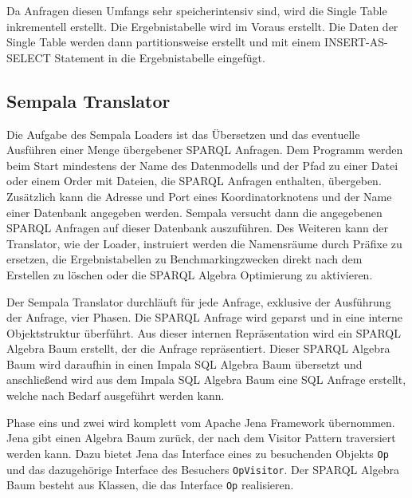 \documentclass[
  a4paper,
  12pt,
  oneside,
  parskip=half,
  headsepline,
]{scrartcl}
\begin{document}
Da Anfragen diesen Umfangs sehr speicherintensiv sind, wird die Single Table
inkrementell erstellt. Die Ergebnistabelle wird im Voraus erstellt. Die Daten der
Single Table werden dann partitionsweise erstellt und mit einem INSERT-AS-SELECT
Statement in die Ergebnistabelle eingefügt.

\subsection{Sempala Translator}
\label{sec:translator}


Die Aufgabe des Sempala Loaders ist das Übersetzen und das eventuelle Ausführen
einer Menge übergebener SPARQL Anfragen. Dem Programm werden beim Start
mindestens der Name des Datenmodells und der Pfad zu einer Datei oder einem
Order mit Dateien, die SPARQL Anfragen enthalten, übergeben. Zusätzlich kann die
Adresse und Port eines Koordinatorknotens und der Name einer Datenbank angegeben
werden. Sempala versucht dann die angegebenen SPARQL Anfragen auf dieser
Datenbank auszuführen. Des Weiteren kann der Translator, wie der Loader,
instruiert werden die Namensräume durch Präfixe zu ersetzen, die
Ergebnistabellen zu Benchmarkingzwecken direkt nach dem Erstellen zu löschen
oder die SPARQL Algebra Optimierung zu aktivieren.

Der Sempala Translator durchläuft für jede Anfrage, exklusive der Ausführung der
Anfrage, vier Phasen. Die SPARQL Anfrage wird geparst und in eine interne
Objektstruktur überführt. Aus dieser internen Repräsentation wird ein SPARQL
Algebra Baum erstellt, der die Anfrage repräsentiert. Dieser SPARQL Algebra Baum
wird daraufhin in einen Impala SQL Algebra Baum übersetzt und anschließend wird
aus dem Impala SQL Algebra Baum eine SQL Anfrage erstellt, welche nach Bedarf
ausgeführt werden kann.

Phase eins und zwei wird komplett vom Apache Jena Framework übernommen. Jena
gibt einen Algebra Baum zurück, der nach dem Visitor Pattern traversiert werden
kann. Dazu bietet Jena das Interface eines zu besuchenden Objekts \texttt{Op}
und das dazugehörige Interface des Besuchers \texttt{OpVisitor}. Der SPARQL
Algebra Baum besteht aus Klassen, die das Interface \texttt{Op} realisieren.
\end{document}

